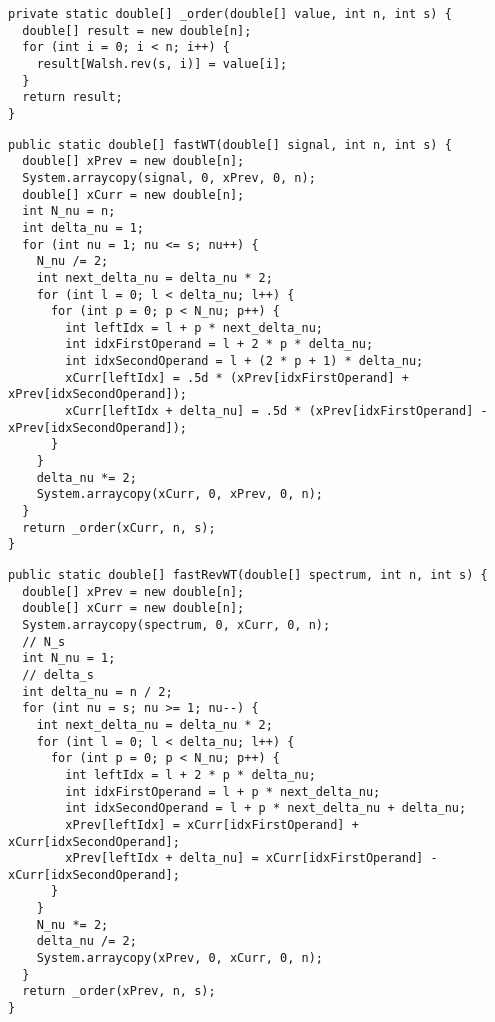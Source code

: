 \begin{lstlisting}[caption={Упорядочивание спектра по частоте}]
private static double[] _order(double[] value, int n, int s) {
  double[] result = new double[n];
  for (int i = 0; i < n; i++) {
    result[Walsh.rev(s, i)] = value[i];
  }
  return result;
}
\end{lstlisting}

\begin{lstlisting}[caption={Быстрое преобразование Уолша}]
public static double[] fastWT(double[] signal, int n, int s) {
  double[] xPrev = new double[n];
  System.arraycopy(signal, 0, xPrev, 0, n);
  double[] xCurr = new double[n];
  int N_nu = n;
  int delta_nu = 1;
  for (int nu = 1; nu <= s; nu++) {
    N_nu /= 2;
    int next_delta_nu = delta_nu * 2;
    for (int l = 0; l < delta_nu; l++) {
      for (int p = 0; p < N_nu; p++) {
        int leftIdx = l + p * next_delta_nu;
        int idxFirstOperand = l + 2 * p * delta_nu;
        int idxSecondOperand = l + (2 * p + 1) * delta_nu;
        xCurr[leftIdx] = .5d * (xPrev[idxFirstOperand] + xPrev[idxSecondOperand]);
        xCurr[leftIdx + delta_nu] = .5d * (xPrev[idxFirstOperand] - xPrev[idxSecondOperand]);
      }
    }
    delta_nu *= 2;
    System.arraycopy(xCurr, 0, xPrev, 0, n);
  }
  return _order(xCurr, n, s);
}
\end{lstlisting}

\begin{lstlisting}[caption={Обратное быстрое преобразование Уолша}]
public static double[] fastRevWT(double[] spectrum, int n, int s) {
  double[] xPrev = new double[n];
  double[] xCurr = new double[n];
  System.arraycopy(spectrum, 0, xCurr, 0, n);
  // N_s
  int N_nu = 1;
  // delta_s
  int delta_nu = n / 2;
  for (int nu = s; nu >= 1; nu--) {
    int next_delta_nu = delta_nu * 2;
    for (int l = 0; l < delta_nu; l++) {
      for (int p = 0; p < N_nu; p++) {
        int leftIdx = l + 2 * p * delta_nu;
        int idxFirstOperand = l + p * next_delta_nu;
        int idxSecondOperand = l + p * next_delta_nu + delta_nu;
        xPrev[leftIdx] = xCurr[idxFirstOperand] + xCurr[idxSecondOperand];
        xPrev[leftIdx + delta_nu] = xCurr[idxFirstOperand] - xCurr[idxSecondOperand];
      }
    }
    N_nu *= 2;
    delta_nu /= 2;
    System.arraycopy(xPrev, 0, xCurr, 0, n);
  }
  return _order(xPrev, n, s);
}
\end{lstlisting}